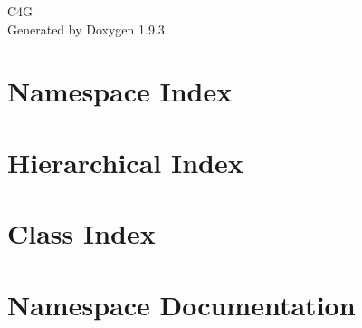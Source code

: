 \documentclass[twoside]{book}
\newcommand{\+}{\discretionary{\mbox{\scriptsize$\hookleftarrow$}}{}{}}
\newcommand{\clearemptydoublepage}{%
    \newpage{\pagestyle{empty}\cleardoublepage}%
  }
\begin{document}
  \raggedbottom
    \hypersetup{pageanchor=false,
                bookmarksnumbered=true,
                pdfencoding=unicode
               }
  \begin{titlepage}
  \vspace*{7cm}
  \begin{center}%
  {\Large C4G}\\
  \vspace*{1cm}
  {\large Generated by Doxygen 1.9.3}\\
  \end{center}
  \end{titlepage}
  \clearemptydoublepage
  \tableofcontents
  \clearemptydoublepage
  \hypersetup{pageanchor=true}
\chapter{Namespace Index}

\chapter{Hierarchical Index}

\chapter{Class Index}

\chapter{Namespace Documentation}




\end{document}

